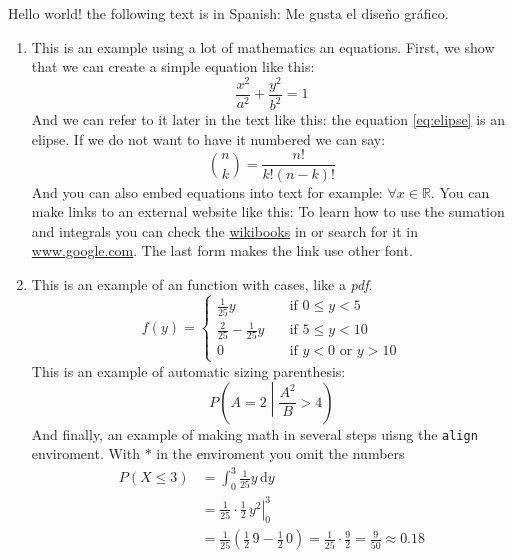 Hello world! the following text is in Spanish: \textspanish{Me gusta el diseño gráfico}.
\begin{enumerate}
 \item 
 This is an example using a lot of mathematics an equations. 
 First, we show that we can create a simple equation like this:
 \begin{equation}
 \label{eq:elipse}
 \frac{x^{2}}{a^{2}} + \frac{y^{2}}{b^{2}} = 1
 \end{equation}
 And we can refer to it later in the text like this: the equation \eqref{eq:elipse} is an elipse.
 If we do not want to have it numbered we can say:
 \begin{equation}
 \nonumber
 \binom{n}{k} = \frac{n!}{k!(n-k)!} 
 \end{equation}
 And you can also embed equations into text for example: $\forall x \in \mathbb{R}$. 
 You can make links to an external website like this: 
 To learn how to use the sumation and integrals you can check the \href{https://en.wikibooks.org/wiki/LaTeX/Mathematics#Sums_and_integrals}{wikibooks} in or search for it in \url{www.google.com}.
 The last form makes the link use other font.
 
 \item This is an example of an function with cases, like a \emph{pdf}.
 \begin{equation}
  \label{eq:pdf}
  f(y) =
  \begin{cases}
    \frac{1}{25} y & \quad \text{if } 0 \leq y < 5 \\
    \frac{2}{25} - \frac{1}{25} y & \quad \text{if } 5 \leq y < 10 \\
    0 & \quad \text{if } y < 0 \text{ or } y > 10
  \end{cases}
 \end{equation}
 This is an example of automatic sizing parenthesis:
 \begin{equation}
  \nonumber
  P\left(A=2\middle|\frac{A^2}{B}>4\right)
 \end{equation}
 And finally, an example of making math in several steps uisng the \verb|align| enviroment.
 With $*$ in the enviroment you omit the numbers
\begin{align*}
P\left(X \leq 3 \right) &= \int_{0}^{3} \frac{1}{25} y \,\mathrm{d}y \\
     &= \left. \frac{1}{25} \cdot \frac{1}{2} \, y^{2} \right|_0^3 \\
     &= \frac{1}{25} \left( \frac{1}{2} \, 9 - \frac{1}{2} \, 0 \right) =
     \frac{1}{25} \cdot \frac{9}{2} = \frac{9}{50} \approx 0.18 
\end{align*}


\end{enumerate}
